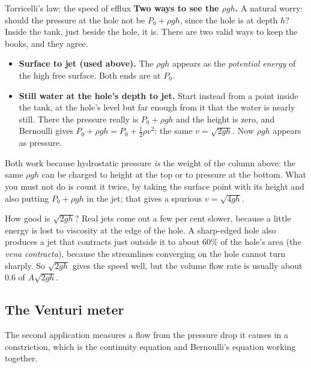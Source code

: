 \begin{derivbox}{Torricelli's law: the speed of efflux}
\medskip
\noindent\textbf{Two ways to see the $\rho gh$.} A natural worry: should the pressure at the hole not be
$P_0+\rho gh$, since the hole is at depth $h$? Inside the tank, just beside the hole, it is. There are two
valid ways to keep the books, and they agree.
\begin{itemize}
\item \textbf{Surface to jet (used above).} The $\rho gh$ appears as the \emph{potential energy} of the high
free surface. Both ends are at $P_0$.
\item \textbf{Still water at the hole's depth to jet.} Start instead from a point inside the tank, at the
hole's level but far enough from it that the water is nearly still. There the pressure really is
$P_0+\rho gh$ and the height is zero, and Bernoulli gives $P_0+\rho gh=P_0+\tfrac12\rho v^2$: the same
$v=\sqrt{2gh}$. Now $\rho gh$ appears as pressure.
\end{itemize}
Both work because hydrostatic pressure \emph{is} the weight of the column above: the same $\rho gh$ can be
charged to height at the top or to pressure at the bottom. What you must not do is count it twice, by
taking the surface point with its height and also putting $P_0+\rho gh$ in the jet; that gives a spurious
$v=\sqrt{4gh}$.
\end{derivbox}

\begin{remarkbox}{How good is $\sqrt{2gh}$?}
Real jets come out a few per cent slower, because a little energy is lost to viscosity at the edge of the
hole. A sharp-edged hole also produces a jet that contracts just outside it to about $60\%$ of the hole's
area (the \emph{vena contracta}), because the streamlines converging on the hole cannot turn sharply.
So $\sqrt{2gh}$ gives the speed well, but the volume flow rate is usually about $0.6$ of $A\sqrt{2gh}$.
\end{remarkbox}

\subsection{The Venturi meter}

The second application measures a flow from the pressure drop it causes in a constriction, which is the
continuity equation and Bernoulli's equation working together.

